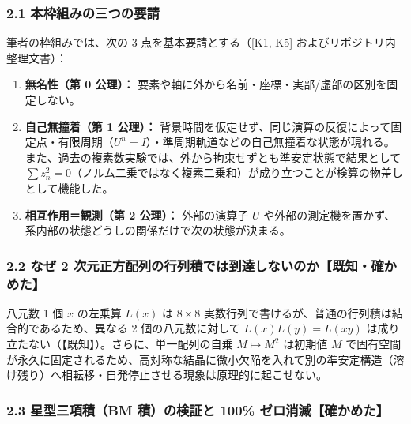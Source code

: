 \documentclass[
  a4paper,
]{ltjsarticle}
\providecommand{\tightlist}{%
  \setlength{\itemsep}{0pt}\setlength{\parskip}{0pt}}
\begin{document}
\subsubsection{2.1
本枠組みの三つの要請}\label{ux672cux67a0ux7d44ux307fux306eux4e09ux3064ux306eux8981ux8acb}

筆者の枠組みでは、次の 3 点を基本要請とする（{[}K1, K5{]}
およびリポジトリ内整理文書）：

\begin{enumerate}
\def\labelenumi{\arabic{enumi}.}
\tightlist
\item
  \textbf{無名性（第 0 公理）：}
  要素や軸に外から名前・座標・実部/虚部の区別を固定しない。
\item
  \textbf{自己無撞着（第 1 公理）：}
  背景時間を仮定せず、同じ演算の反復によって固定点・有限周期（\(U^n = I\)）・準周期軌道などの自己無撞着な状態が現れる。また、過去の複素数実験では、外から拘束せずとも準安定状態で結果として
  \(\sum z_n^2 = 0\)（ノルム二乗ではなく複素二乗和）が成り立つことが検算の物差しとして機能した。
\item
  \textbf{相互作用＝観測（第 2 公理）：} 外部の演算子 \(U\)
  や外部の測定機を置かず、系内部の状態どうしの関係だけで次の状態が決まる。
\end{enumerate}

\subsubsection{2.2 なぜ 2
次元正方配列の行列積では到達しないのか【既知・確かめた】}\label{ux306aux305c-2-ux6b21ux5143ux6b63ux65b9ux914dux5217ux306eux884cux5217ux7a4dux3067ux306fux5230ux9054ux3057ux306aux3044ux306eux304bux65e2ux77e5ux78baux304bux3081ux305f}

八元数 1 個 \(x\) の左乗算 \(L(x)\) は \(8 \times 8\)
実数行列で書けるが、普通の行列積は結合的であるため、異なる 2
個の八元数に対して \(L(x)L(y) = L(xy)\)
は成り立たない（【既知】）。さらに、単一配列の自乗 \(M \mapsto M^2\)
は初期値 \(M\)
で固有空間が永久に固定されるため、高対称な結晶に微小欠陥を入れて別の準安定構造（溶け残り）へ相転移・自発停止させる現象は原理的に起こせない。

\subsubsection{2.3 星型三項積（BM 積）の検証と 100\%
ゼロ消滅【確かめた】}\label{ux661fux578bux4e09ux9805ux7a4dbm-ux7a4dux306eux691cux8a3cux3068-100-ux30bcux30edux6d88ux6ec5ux78baux304bux3081ux305f}
\end{document}
